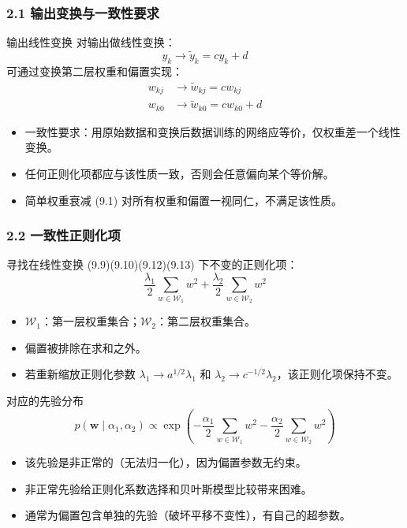 \documentclass[t,aspectratio=169]{beamer} %
\begin{document}
\begin{frame}
    \frametitle{2.1 输出变换与一致性要求}
    \begin{block}{输出线性变换}
        对输出做线性变换：
        \begin{equation}
            y_k \to \widetilde{y}_k = c y_k + d
            \tag{9.11}
        \end{equation}
        可通过变换第二层权重和偏置实现：
        \begin{align}
            w_{kj} &\to \widetilde{w}_{kj} = c w_{kj} \tag{9.12} \\
            w_{k0} &\to \widetilde{w}_{k0} = c w_{k0} + d \tag{9.13}
        \end{align}
    \end{block}
    \begin{itemize}
        \item \alert{一致性要求}：用原始数据和变换后数据训练的网络应等价，仅权重差一个线性变换。
        \item 任何正则化项都应与该性质\alert{一致}，否则会任意偏向某个等价解。
        \item 简单权重衰减 (9.1) 对所有权重和偏置\alert{一视同仁}，\alert{不满足}该性质。
    \end{itemize}
\end{frame}

\begin{frame}[allowframebreaks]
    \frametitle{2.2 一致性正则化项}
    寻找在线性变换 (9.9)(9.10)(9.12)(9.13) 下\alert{不变}的正则化项：
    \begin{equation}
        \frac{\lambda_1}{2} \sum_{w \in \mathcal{W}_1} w^2 + \frac{\lambda_2}{2} \sum_{w \in \mathcal{W}_2} w^2
        \tag{9.14}
    \end{equation}
    \begin{itemize}
        \item $\mathcal{W}_1$：第一层权重集合；$\mathcal{W}_2$：第二层权重集合。
        \item \alert{偏置被排除}在求和之外。
        \item 若重新缩放正则化参数 $\lambda_1 \to a^{1/2} \lambda_1$ 和 $\lambda_2 \to c^{-1/2} \lambda_2$，该正则化项保持不变。
    \end{itemize}
    \begin{block}{对应的先验分布}
        \begin{equation}
            p(\mathbf{w} \mid \alpha_1, \alpha_2) \propto \exp\left( -\frac{\alpha_1}{2} \sum_{w \in \mathcal{W}_1} w^2 - \frac{\alpha_2}{2} \sum_{w \in \mathcal{W}_2} w^2 \right)
            \tag{9.15}
        \end{equation}
        \begin{itemize}
            \item 该先验是\alert{非正常}的（无法归一化），因为偏置参数无约束。
            \item 非正常先验给正则化系数选择和贝叶斯模型比较带来困难。
            \item 通常为偏置包含\alert{单独的先验}（破坏平移不变性），有自己的超参数。
        \end{itemize}
    \end{block}
\end{frame}
\end{document}
